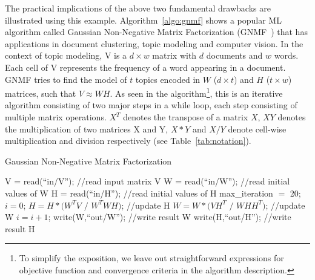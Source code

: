 \begin{example}
\label{ex:gnmf}
The practical implications of the above two fundamental drawbacks are illustrated using this
example. Algorithm~\ref{algo:gnmf} shows a popular ML algorithm called Gaussian Non-Negative Matrix
Factorization (GNMF~\cite{LeeSeungGNMF}) that has applications in document clustering, topic modeling and computer vision. In the context
of topic modeling, V is a $d\times w$ matrix with $d$ documents and $w$ words. Each cell of V
represents the frequency of a word appearing in a document. GNMF tries to find the model of $t$
topics encoded in $W$ ($d\times t$) and $H$ ($t\times w$) matrices, such that $V\approx WH$. As seen
in the algorithm\footnote{To simplify the exposition, we leave out straightforward expressions for objective function and convergence criteria in the algorithm description.}, this is an iterative algorithm consisting of two major steps in a while loop, each step consisting of multiple matrix operations. $X^T$ denotes the transpose of a matrix $X$,
$XY$ denotes the multiplication of two matrices X and Y, $X*Y$ and $X/Y$ denote cell-wise
multiplication and division respectively (see Table~\ref{tab:notation}).
\end{example}

\begin{scriptsize}
\begin{algorithm}[h]
\caption{Gaussian Non-Negative Matrix Factorization}
\label{algo:gnmf}
\footnotesize
\begin{algorithmic}[1]
\STATE V = read(``in/V'');  //read input matrix V
\STATE W = read(``in/W'');  //read initial values of W
\STATE H = read(``in/H'');  //read initial values of H
\STATE max\_iteration $=$ 20;
\STATE $i = 0$;
\STATE $H = H * (W^TV$ $/$ $W^TWH)$;  //update H
\STATE $W = W * (VH^T$ $/$ $WHH^T)$;  //update W
\STATE $i = i + 1$;
\ENDWHILE
\STATE write(W,``out/W'');  //write result W
\STATE write(H,``out/H'');  //write result H
\end{algorithmic}
\end{algorithm}
\end{scriptsize}

